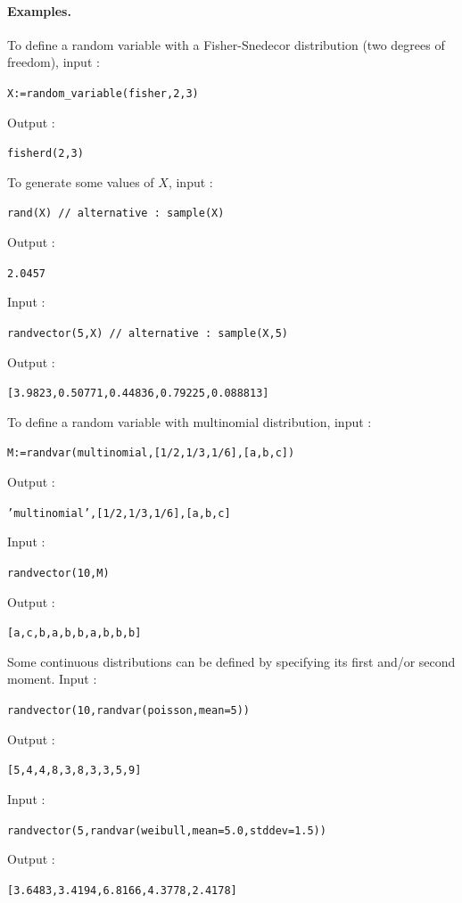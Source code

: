 \documentclass[a4paper,11pt]{book}
\begin{document}
\paragraph{Examples.} To define a random variable with a Fisher-Snedecor distribution (two degrees of freedom), input :
\begin{center}
  \tt X:=random\_variable(fisher,2,3)
\end{center}
Output :
\begin{center}
  \tt fisherd(2,3)
\end{center}
To generate some values of $X$, input :
\begin{center}
  \tt rand(X) // alternative : sample(X)
\end{center}
Output :
\begin{center}
  \tt 2.0457
\end{center}
Input :
\begin{center}
  \tt randvector(5,X) // alternative : sample(X,5)
\end{center}
Output :
\begin{center}
  \tt [3.9823,0.50771,0.44836,0.79225,0.088813]
\end{center}
To define a random variable with multinomial distribution, input :
\begin{center}
  \tt M:=randvar(multinomial,[1/2,1/3,1/6],[a,b,c])
\end{center}
Output :
\begin{center}
  \tt 'multinomial',[1/2,1/3,1/6],[a,b,c]
\end{center}
Input :
\begin{center}
  \tt randvector(10,M)
\end{center}
Output :
\begin{center}
  \tt [a,c,b,a,b,b,a,b,b,b]
\end{center}
Some continuous distributions can be defined by specifying its first and/or second moment. Input :
\begin{center}
  \tt randvector(10,randvar(poisson,mean=5))
\end{center}
Output :
\begin{center}
  \tt [5,4,4,8,3,8,3,3,5,9]
\end{center}
Input :
\begin{center}
  \tt randvector(5,randvar(weibull,mean=5.0,stddev=1.5))
\end{center}
Output :
\begin{center}
  \tt [3.6483,3.4194,6.8166,4.3778,2.4178]
\end{center}
\end{document}
